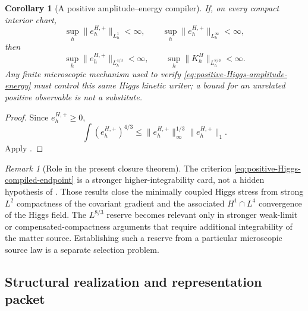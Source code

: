 \documentclass[11pt]{article}
\numberwithin{equation}{section}
\newtheorem{corollary}[corollary]{Corollary}
\theoremstyle{definition}
\theoremstyle{remark}
\newtheorem{remark}[remark]{Remark}
\begin{document}
\begin{corollary}[A positive amplitude--energy compiler]
\label{cor:positive-Higgs-amplitude-criterion}
If, on every compact interior chart,
\begin{equation}
 \sup_h\|e_h^{H,+}\|_{L^1_h}<\infty,
 \qquad
 \sup_h\|e_h^{H,+}\|_{L^\infty_h}<\infty,
 \label{eq:positive-Higgs-amplitude-energy}
\end{equation}
then
\begin{equation}
 \sup_h\|e_h^{H,+}\|_{L_h^{4/3}}<\infty,
 \qquad
 \sup_h\|K_h^H\|_{L_h^{8/3}}<\infty.
 \label{eq:positive-Higgs-compiled-endpoint}
\end{equation}
Any finite microscopic mechanism used to verify
\eqref{eq:positive-Higgs-amplitude-energy} must control this same Higgs kinetic
writer; a bound for an unrelated positive observable is not a substitute.
\end{corollary}
\begin{proof}
Since $e_h^{H,+}\ge0$,
\[
 \int (e_h^{H,+})^{4/3}
 \le \|e_h^{H,+}\|_\infty^{1/3}\|e_h^{H,+}\|_1.
\]
Apply .
\end{proof}

\begin{remark}[Role in the present closure theorem]
\label{rem:positive-Higgs-endpoint-scope}
The criterion \eqref{eq:positive-Higgs-compiled-endpoint} is a stronger
higher-integrability card, not a hidden hypothesis of
.  Those results
close the minimally coupled Higgs stress from strong $L^2$ compactness of the
covariant gradient and the associated $H^1\cap L^4$ convergence of the Higgs
field.  The $L^{8/3}$ reserve becomes relevant only in stronger weak-limit or
compensated-compactness arguments that require additional integrability of
the matter source.  Establishing such a reserve from a particular microscopic
source law is a separate selection problem.
\end{remark}

\subsection{Structural realization and representation packet}
\label{app:structural-packet}
\end{document}
